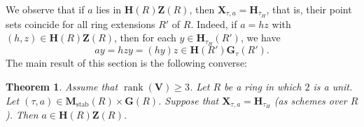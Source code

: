 \documentclass[reqno]{amsart}
\DeclareMathOperator{\stab}{stab}
\DeclareMathOperator{\rank}{rank}
\theoremstyle{plain} \newtheorem{theorem} {Theorem} \newtheorem{conjecture} {Conjecture} \newtheorem{corollary} [theorem] {Corollary} \newtheorem{proposition} [theorem] {Proposition} \newtheorem{fact} [theorem] {Fact}
\theoremstyle{definition} \newtheorem{definition} [theorem] {Definition}
\theoremstyle{itplain} %
\begin{document}
We observe that if $a$ lies in $\mathbf{H}(R) \mathbf{Z}(R)$, then $\mathbf{X}_{\tau,a} = \mathbf{H}_{\tau_H}$, that is, their point sets coincide for all ring extensions $R'$ of $R$.  Indeed, if $a = h z$ with $(h,z) \in \mathbf{H}(R) \mathbf{Z}(R)$, then for each $y \in \mathbf{H}_{\tau_H}(R')$, we have
\begin{equation*}
  a y = h z y = (h y) z \in \mathbf{H}(R') \mathbf{G}_{\tau}(R').
\end{equation*}
The main result of this section is the following converse:

\begin{theorem}\label{theorem:main-transversality-general-ring}
  Assume that $\rank(\mathbf{V}) \geq 3$.  Let $R$ be a ring in which $2$ is a unit.  Let $(\tau,a) \in \mathbf{M}_{\stab}(R) \times \mathbf{G}(R)$.  Suppose that $\mathbf{X}_{\tau,a} = \mathbf{H}_{\tau_H}$ (as schemes over $R$).  Then $a \in \mathbf{H}(R) \mathbf{Z}(R)$.
\end{theorem}
\end{document}
